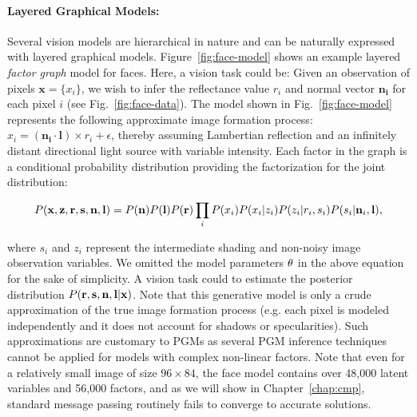 \paragraph{Layered Graphical Models:} Several vision models are hierarchical
in nature and can be naturally expressed
with layered graphical models. Figure~\ref{fig:face-model} shows an example
layered \textit{factor graph} model for faces. Here, a vision task could be:
Given an observation of pixels $\mathbf{x} = \{x_i\}$,
we wish to infer the reflectance value $r_i$ and normal vector $\mathbf{n_i}$
for each pixel $i$ (see Fig.~\ref{fig:face-data}).
The model shown in Fig.~\ref{fig:face-model} represents the following approximate image
formation process: $x_i = (\mathbf{n_i} \cdot \mathbf{l}) \times r_i + \epsilon$,
thereby assuming Lambertian reflection and an infinitely distant directional
light source with variable intensity. Each factor in the graph is a
conditional probability distribution providing the factorization for the
joint distribution:

\begin{equation}
P(\mathbf{x}, \mathbf{z}, \mathbf{r}, \mathbf{s}, \mathbf{n}, \mathbf{l})
= P(\mathbf{n}) P(\mathbf{l}) P(\mathbf{r}) \prod_i P(x_i) P(x_i | z_i)
P(z_i | r_i, s_i) P(s_i | \mathbf{n}_i, \mathbf{l}),
\end{equation}

where $s_i$ and $z_i$ represent the intermediate shading and non-noisy
image observation variables. We omitted the model parameters $\mathbf{\theta}$
in the above equation for the sake of simplicity.
A vision task could to estimate the posterior distribution
$P(\mathbf{r}, \mathbf{s}, \mathbf{n}, \mathbf{l} | \mathbf{x})$.
Note that this generative model is only a crude
approximation of the true image formation process
(e.g. each pixel is modeled independently and it does not account for
shadows or specularities). Such approximations are customary to PGMs as
several PGM inference techniques cannot be applied for models with complex
non-linear factors. Note that even for a relatively small image of
size $96 \times 84$, the face model contains over 48,000 latent variables
and 56,000 factors, and as we will show in Chapter~\ref{chap:cmp},
standard message passing routinely fails to converge to
accurate solutions.

